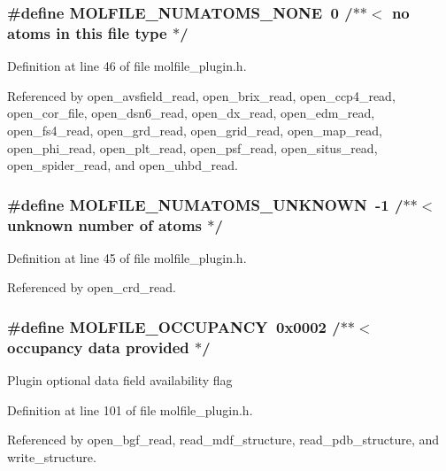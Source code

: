 \subsubsection{\setlength{\rightskip}{0pt plus 5cm}\#define MOLFILE\_\-NUMATOMS\_\-NONE\ 0   /$\ast$$\ast$$<$ no atoms in this file type    $\ast$/}\label{molfile__plugin_8h_a7}




Definition at line 46 of file molfile\_\-plugin.h.

Referenced by open\_\-avsfield\_\-read, open\_\-brix\_\-read, open\_\-ccp4\_\-read, open\_\-cor\_\-file, open\_\-dsn6\_\-read, open\_\-dx\_\-read, open\_\-edm\_\-read, open\_\-fs4\_\-read, open\_\-grd\_\-read, open\_\-grid\_\-read, open\_\-map\_\-read, open\_\-phi\_\-read, open\_\-plt\_\-read, open\_\-psf\_\-read, open\_\-situs\_\-read, open\_\-spider\_\-read, and open\_\-uhbd\_\-read.
\subsubsection{\setlength{\rightskip}{0pt plus 5cm}\#define MOLFILE\_\-NUMATOMS\_\-UNKNOWN\ -1   /$\ast$$\ast$$<$ unknown number of atoms       $\ast$/}\label{molfile__plugin_8h_a6}




Definition at line 45 of file molfile\_\-plugin.h.

Referenced by open\_\-crd\_\-read.
\subsubsection{\setlength{\rightskip}{0pt plus 5cm}\#define MOLFILE\_\-OCCUPANCY\ 0x0002 /$\ast$$\ast$$<$ occupancy data provided          $\ast$/}\label{molfile__plugin_8h_a10}


Plugin optional data field availability flag 

Definition at line 101 of file molfile\_\-plugin.h.

Referenced by open\_\-bgf\_\-read, read\_\-mdf\_\-structure, read\_\-pdb\_\-structure, and write\_\-structure.
